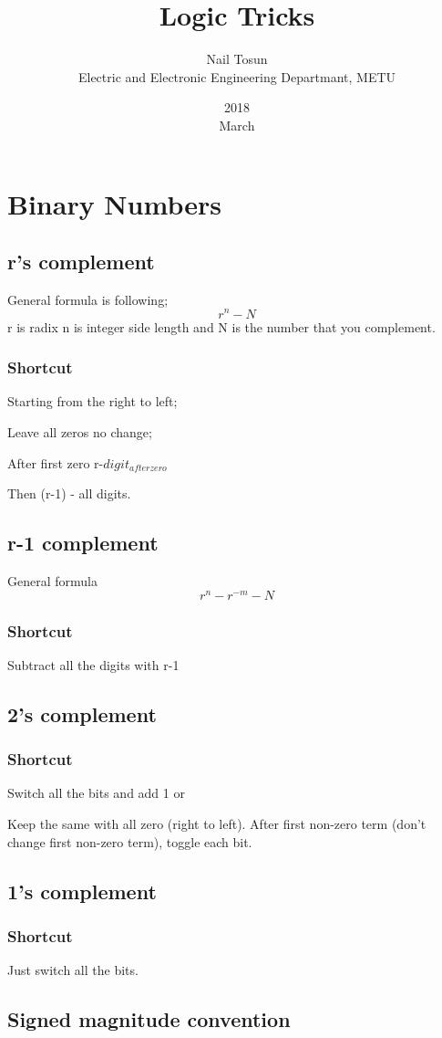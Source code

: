 \documentclass[11pt]{article}
\title{Logic Tricks}
\date{2018\\ March}
\author{Nail Tosun \\ Electric and Electronic Engineering Departmant, METU}
\begin{document}
\maketitle
\section*{Binary Numbers}
\subsection*{r's complement}
General formula is following;
\[r^n-N\]
r is radix n is integer side length and N is the number that you complement.
\subsubsection*{Shortcut}
Starting from the right to left;

Leave all zeros no change;

After first zero r-$digit_{afterzero}$

Then (r-1) - all digits.

\subsection*{r-1 complement}
General formula 
\[r^n-r^{-m}-N\]
\subsubsection*{Shortcut}
Subtract all the digits with r-1
\subsection*{2's complement}
\subsubsection*{Shortcut}
Switch all the bits and add 1 or

Keep the same with all zero (right to left). After first non-zero term (don't change first non-zero term), toggle each bit.
\subsection*{1's complement}
\subsubsection*{Shortcut}
Just switch all the bits.


\subsection*{Signed magnitude convention}
\end{document}
